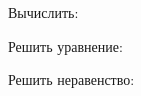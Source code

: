 \begin{enumcols}[label=\textbf{\arabic*.}]
	\item Вычислить:
	\begin{enumcols}[columns=2]
		\item {}
		\item {}
		\item {}
	\end{enumcols}
	\item Решить уравнение:
	\begin{enumcols}[columns=2]
		\item {}
		\item {}
		\item {}
		\item {}
	\end{enumcols}
	\item Решить неравенство:
	\begin{enumcols}[columns=2]
		\item {}
		\item {}
		\item {}
	\end{enumcols}
	
\end{enumcols}
